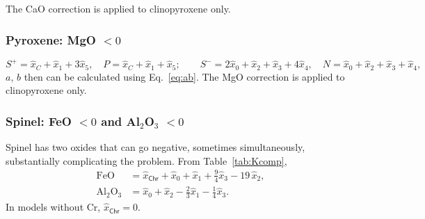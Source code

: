 The CaO correction is applied to clinopyroxene only.

\subsubsection{Pyroxene: MgO $<0$}

\begin{equation}
  S^+ = \hat x_C + \hat x_1 + 3\hat x_5, \quad P = \hat x_C + \hat x_1 + \hat x_5; \qquad
  S^- = 2\hat x_0 + \hat x_2 + \hat x_3 + 4\hat x_4, \quad N = \hat x_0 + \hat x_2 + \hat x_3 + \hat x_4,
\end{equation}
$a$, $b$ then can be calculated using Eq.~\eqref{eq:ab}. The MgO correction
is applied to clinopyroxene only.

\subsubsection{Spinel: FeO $< 0$ and Al$_2$O$_3$ $< 0$}

Spinel has two oxides that can go negative, sometimes simultaneously, substantially complicating the problem. From Table~\ref{tab:Kcomp},
\begin{align}
  \text{FeO} &= \hat x_{\mathsf{Chr}} + \hat x_0 + \hat x_1 + \tfrac94\hat x_3 - 19\,\hat x_2, \label{eq:spFe}\\
  \text{Al}_2\text{O}_3 &= \hat x_0 + \hat x_2 - \tfrac23\hat x_1 - \tfrac14\hat x_3 . \label{eq:spAl}
\end{align}
In models without Cr, $\hat x_{\mathsf{Chr}} = 0$.


